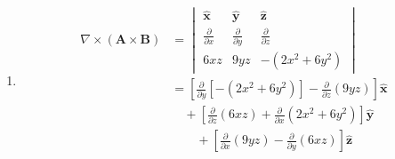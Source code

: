 \documentclass[a4paper]{article}
\begin{document}
\begin{enumerate}[label=(\alph*)]
\begin{align*}
\begin{vmatrix}
								\pmb{\hat{x}} & \pmb{\hat{y}} & \pmb{\hat{z}} \\
								x & 2y & 3z \\
								0 & 0 & -5
							\end{vmatrix} \\
														      & = \boxed{-10y \pmb{\hat{x}} + 5x \pmb{\hat{y}}} \\
								\boxed{\pmb{B} \times \!\left( \nabla \times \pmb{A} \right)} & = \boxed{\pmb{0}} \\
								\boxed{\!\left( \pmb{A} \cdot \nabla \right)\pmb{B}} & = x \frac{\partial \pmb{B}}{\partial x} + 2y \frac{\partial \pmb{B}}{\partial y} \\
														     & = \boxed{6y \pmb{\hat{x}} - 2x \pmb{\hat{y}}} \\
								\boxed{\!\left( \pmb{B} \cdot \nabla \right)\pmb{A}} & = 3y \frac{\partial \pmb{A}}{\partial x} - 2x \frac{\partial \pmb{A}}{\partial y} \\
														     & = \boxed{3y \pmb{\hat{x}} - 4x \pmb{\hat{y}}}
\end{align*}
Summing our terms together, derive
\[
	\pmb{A} \times \!\left( \nabla \times \pmb{B} \right) + \pmb{B} \times \!\left( \nabla \times \pmb{A} \right) + \!\left( \pmb{A} \cdot \nabla \right)\pmb{B} + \!\left( \pmb{B} \cdot \nabla \right)\pmb{A} = \boxed{-y \pmb{\hat{x}} - x \pmb{\hat{y}}}
\]
	\item \begin{align*}
		\boxed{\nabla \times \!\left( \pmb{A} \times \pmb{B} \right)} & = \begin{vmatrix}
			\pmb{\hat{x}} & \pmb{\hat{y}} & \pmb{\hat{z}} \\
			\frac{\partial }{\partial x} & \frac{\partial }{\partial y} & \frac{\partial }{\partial z} \\
			6xz & 9yz & -\!\left( 2x^{2} + 6y^{2} \right)
		\end{vmatrix} \\
									      & = \!\left[ \frac{\partial }{\partial y}\!\left[ -\!\left( 2x^{2} + 6y^{2} \right)\right] - \frac{\partial }{\partial z}\!\left( 9yz \right) \right]\pmb{\hat{x}} \\
									      & \quad + \!\left[ \frac{\partial }{\partial z}\!\left( 6xz \right) + \frac{\partial }{\partial x}\!\left( 2x^{2} + 6y^{2} \right) \right]\pmb{\hat{y}} \\ 
									      & \qquad + \!\left[ \frac{\partial }{\partial x}\!\left( 9yz \right) - \frac{\partial }{\partial y}\!\left( 6xz \right) \right]\pmb{\hat{z}} \\

\end{align*}
\end{enumerate}
\end{document}
